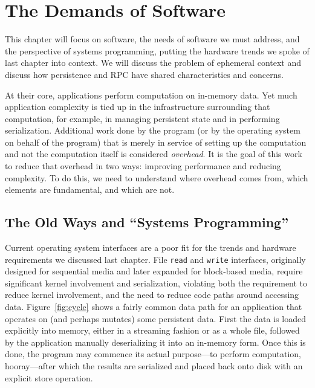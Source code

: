 
\chapter{The Demands of Software}\label{ch:softwaredemands}

\begin{chabstract}
    This chapter will focus on software, the needs of software we must address, and the perspective of systems
    programming, putting the hardware trends we spoke of last chapter into context. We will discuss the problem of
    ephemeral context and discuss how persistence and RPC have shared characteristics and concerns.
\end{chabstract}

At their core, applications perform computation on in-memory data. Yet much application complexity is tied up in the
infrastructure surrounding that computation, for example, in managing persistent state and in performing serialization.
Additional work done by the program (or by the operating system on behalf of the program) that is merely in service of
setting up the computation and not the computation itself is considered \emph{overhead}. It is the goal of this work to
reduce that overhead in two ways: improving performance and reducing complexity. To do this, we need to understand where
overhead comes from, which elements are fundamental, and which are not.

\section{The Old Ways and ``Systems Programming''}

Current operating system interfaces are a poor fit for the trends and hardware requirements we discussed last chapter.
File \texttt{read} and \texttt{write} interfaces, originally designed for sequential media and later expanded for
block-based media, require significant kernel involvement and serialization, violating both the requirement to reduce
kernel involvement, and the need to reduce code paths around accessing data. Figure~\ref{fig:cycle} shows a fairly
common data path for an application that operates on (and perhaps mutates) some persistent data. First the data is
loaded explicitly into memory, either in a streaming fashion or as a whole file, followed by the application manually
deserializing it into an in-memory form. Once this is done, the program may commence its actual purpose---to perform
computation, hooray---after which the results are serialized and placed back onto disk with an explicit store operation.

